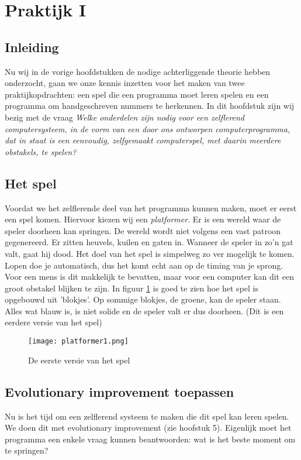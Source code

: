 \section{Praktijk I}

\subsection{Inleiding}
Nu wij in de vorige hoofdstukken de nodige achterliggende theorie hebben onderzocht, gaan we onze kennis inzetten voor het maken van twee praktijkopdrachten: een spel die een programma moet leren spelen en een programma om handgeschreven nummers te herkennen. In dit hoofdstuk zijn wij bezig met de vraag \textit{Welke onderdelen zijn nodig voor een zelflerend computersysteem, in de vorm van een door ons ontworpen computerprogramma, dat in staat is een eenvoudig, zelfgemaakt computerspel, met daarin meerdere obstakels, te spelen?}

\subsection{Het spel}
Voordat we het zelflerende deel van het programma kunnen maken, moet er eerst een spel komen. Hiervoor kiezen wij een \textit{platformer}. Er is een wereld waar de speler doorheen kan springen. De wereld wordt niet volgens een vast patroon gegenereerd. Er zitten heuvels, kuilen en gaten in. Wanneer de speler in zo'n gat valt, gaat hij dood. Het doel van het spel is simpelweg zo ver mogelijk te komen. Lopen doe je automatisch, dus het komt echt aan op de timing van je sprong. Voor een mens is dit makkelijk te bevatten, maar voor een computer kan dit een groot obstakel blijken te zijn.
In figuur \ref{fig:platformer1} is goed te zien hoe het spel is opgebouwd uit 'blokjes'. Op sommige blokjes, de groene, kan de speler staan. Alles wat blauw is, is niet solide en de speler valt er dus doorheen. (Dit is een eerdere versie van het spel)

\begin{figure}[h]
  \centering
    \texttt{[image: platformer1.png]}
  \caption{De eerste versie van het spel}
  \label{fig:platformer1}
\end{figure}

\subsection{Evolutionary improvement toepassen}
Nu is het tijd om een zelflerend systeem te maken die dit spel kan leren spelen. We doen dit met evolutionary improvement (zie hoofstuk 5). Eigenlijk moet het programma een enkele vraag kunnen beantwoorden: wat is het beste moment om te springen?

